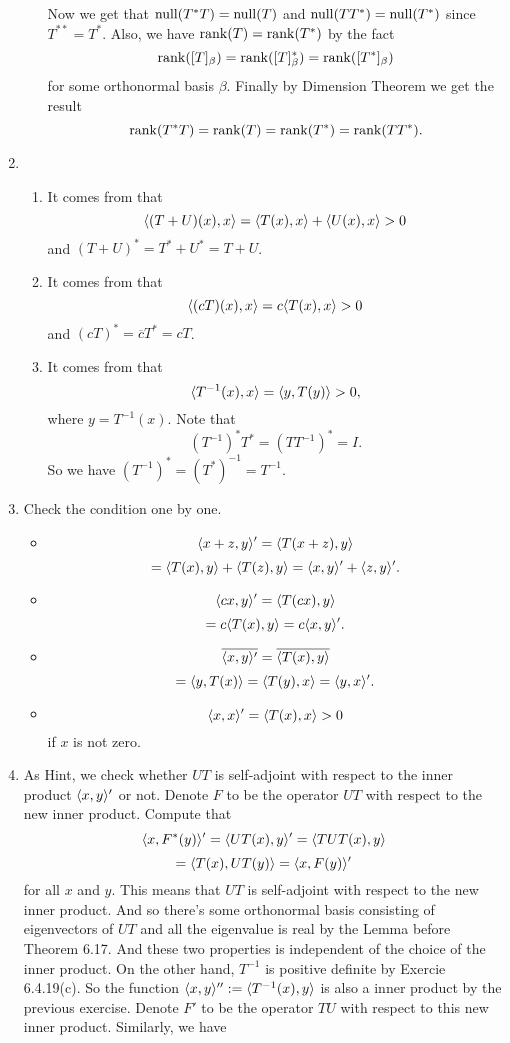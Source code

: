 \begin{enumerate}
\begin{enumerate}
Now we get that $\operatorname{null}(T^*T)=\operatorname{null}(T)$ and $\operatorname{null}(TT^*)=\operatorname{null}(T^*)$ since $T^{**}=T^*$. Also, we have $\operatorname{rank}(T)=\operatorname{rank}(T^*)$ by the fact 
\[\operatorname{rank}([T]_{\beta})=\operatorname{rank}([T]_{\beta}^*)=\operatorname{rank}([T^*]_{\beta})\]
for some orthonormal basis $\beta $. Finally by Dimension Theorem we get the result
\[\operatorname{rank}(T^*T)=\operatorname{rank}(T)=\operatorname{rank}(T^*)=\operatorname{rank}(TT^*).\]
\end{enumerate}
\item \begin{enumerate}
\item It comes from that 
\[\langle (T+U)(x),x\rangle =\langle T(x),x\rangle +\langle U(x),x\rangle >0\]
and $(T+U)^*=T^*+U^*=T+U$.
\item It comes from that 
\[\langle (cT)(x),x\rangle =c\langle T(x),x\rangle >0\]
and $(cT)^*=\overline{c}T^*=cT$.
\item It comes from that
\[\langle T^{-1}(x),x\rangle =\langle y,T(y)\rangle >0,\]
where $y=T^{-1}(x)$. Note that 
\[(T^{-1})^*T^*=(TT^{-1})^*=I.\]
So we have $(T^{-1})^*=(T^*)^{-1}=T^{-1}$.
\end{enumerate}
\item Check the condition one by one. \begin{itemize}
\item \[\langle x+z,y\rangle'=\langle T(x+z),y\rangle \]
\[=\langle T(x),y\rangle +\langle T(z),y\rangle =\langle x,y\rangle'+\langle z,y\rangle'.\]
\item \[\langle cx,y\rangle' =\langle T(cx),y\rangle \]
\[=c\langle T(x),y\rangle = c\langle x,y\rangle'.\]
\item \[\overline{\langle x,y\rangle' }=\overline{\langle T(x),y\rangle }\]
\[=\langle y,T(x)\rangle =\langle T(y),x\rangle =\langle y,x\rangle'.\]
\item \[\langle x,x\rangle'=\langle T(x),x\rangle >0\]
if $x$ is not zero.
\end{itemize}
\item As Hint, we check whether $UT$ is self-adjoint with respect to the inner product $\langle x,y\rangle'$ or not. Denote $F$ to be the operator $UT$ with respect to the new inner product. Compute that 
\[\langle x,F^*(y)\rangle'=\langle UT(x),y\rangle' =\langle TUT(x),y\rangle \]
\[=\langle T(x),UT(y)\rangle=\langle x,F(y)\rangle'\]
for all $x$ and $y$. This means that $UT$ is self-adjoint with respect to the new inner product. And so there's some orthonormal basis consisting of eigenvectors of $UT$ and all the eigenvalue is real by the Lemma before Theorem 6.17. And these two properties is independent of the choice of the inner product. On the other hand, $T^{-1}$ is positive definite by Exercie 6.4.19(c). So the function $\langle x,y\rangle'':=\langle T^{-1}(x),y\rangle $ is also a inner product by the previous exercise. Denote $F'$ to be the operator $TU$ with respect to this new inner product. Similarly, we have 

\end{enumerate}
